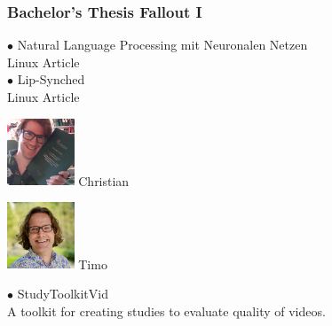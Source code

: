 \documentclass[aspectratio=169]{beamer}
\begin{document}
\begin{frame}[fragile]
	\frametitle{Bachelor's Thesis Fallout I}
    \begin{minipage}{.63\textwidth}
        {\color{thiscolor}$\bullet$} Natural Language Processing mit Neuronalen Netzen 
        \\ \citep{baumann2022NaturalLanguageProcessing} Linux Article
        \\ {\color{thiscolor}$\bullet$} Lip-Synched 
        \\ \citep{baumann2023LipSynchedLinuxMagazine} Linux Article
        
        \begin{minipage}{1.0\textwidth}
            \centering
                \begin{minipage}{.3\textwidth}
                    \centering
                    \includegraphics[height=2cm]{images/Christian_Schuler_Thesis.jpg} 
                    Christian
                \end{minipage}
                \begin{minipage}{.3\textwidth}
                    \centering
                    \includegraphics[height=2cm]{images/Timo_Baumann.jpg}
                    Timo
                \end{minipage}
        \end{minipage}
    \end{minipage}\hfill%
    \begin{minipage}{.32\textwidth}
        {\color{thiscolor}$\bullet$} StudyToolkitVid
        \\ A toolkit for creating studies to evaluate quality of videos.

\end{minipage}
\end{frame}
\end{document}
